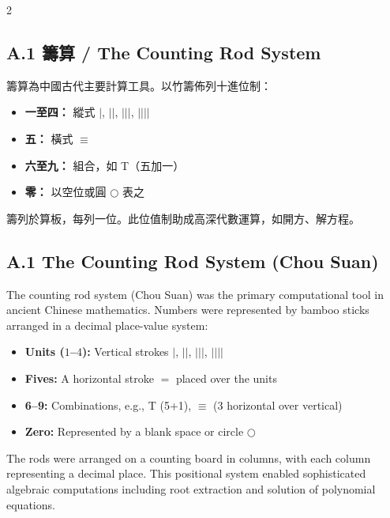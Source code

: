 \documentclass[11pt,a4paper]{article}
\begin{document}
\begin{paracol}{2}

\begin{leftcolumn*}
\subsection*{A.1 籌算 / The Counting Rod System}

籌算為中國古代主要計算工具。以竹籌佈列十進位制：
\begin{itemize}[leftmargin=*,nosep]
  \item \textbf{一至四：} 縱式 $|$, $||$, $|||$, $||||$
  \item \textbf{五：} 橫式 $\equiv$
  \item \textbf{六至九：} 組合，如 T（五加一）
  \item \textbf{零：} 以空位或圓 $\bigcirc$ 表之
\end{itemize}

籌列於算板，每列一位。此位值制助成高深代數運算，如開方、解方程。
\end{leftcolumn*}

\begin{rightcolumn}
\subsection*{A.1 The Counting Rod System (Chou Suan)}

The counting rod system (Chou Suan) was the primary computational tool in 
ancient Chinese mathematics. Numbers were represented by bamboo sticks 
arranged in a decimal place-value system:
\begin{itemize}[leftmargin=*,nosep]
  \item \textbf{Units ($1$--$4$):} Vertical strokes $|$, $||$, 
    $|||$, $||||$
  \item \textbf{Fives:} A horizontal stroke $=$ placed over the units
  \item \textbf{6--9:} Combinations, e.g., T (5+1), 
    $\equiv$ (3 horizontal over vertical)
  \item \textbf{Zero:} Represented by a blank space or circle $\bigcirc$
\end{itemize}

The rods were arranged on a counting board in columns, with each column 
representing a decimal place. This positional system enabled sophisticated 
algebraic computations including root extraction and solution of polynomial 
equations.
\end{rightcolumn}


\end{paracol}
\end{document}
